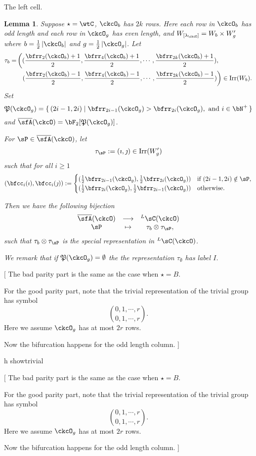 \documentclass[12pt,a4paper]{amsart}
\newcommand{\trivial}[2][]{\if\relax\detokenize{#1}\relax
  {%
      \color{orange} \vspace{0em} $[$  #2 $]$
      \color{black}
  }
  \else
\ifx#1h
\ifcsname showtrivial\endcsname
{%
    \color{orange} \vspace{0em}  $[$ #2 $]$
    \color{black}
}
\fi
\else {\red Wrong argument!} \fi
\fi
}
\def\abs#1{\left|{#1}\right|}
\newcommand{\CQ}{{\mathcal {Q}}}
\numberwithin{equation}{section}
\newtheorem{lem}[thm]{Lemma}
\theoremstyle{remark}
\def\half{{\tfrac{1}{2}}}
\def\Irr{\mathrm{Irr}}
\def\WLamck{W_{[\lambda_{\ckcO}]}}
\def\LC{{}^L\sC}
\def\CQ{\overline{\sfA}}%
\def\CPP{\mathfrak{P}}
\begin{document}
The left cell.
\begin{lem}
  Suppose $\star = \wtC$, $\ckcO_{b}$ has $2k$ rows. Here each row in $\ckcO_{b}$ has
  odd length and each row in $\ckcO_{g}$ has even length, and
  $\WLamck = W_{b}\times W'_{g}$ where $b=\half \abs{\ckcO_{b}}$ and
  $g = \half\abs{\ckcO_{g}}$.
  Let
  \[
    \begin{split}
      \tau_{b} =  & \left( (\frac{\bfrr_{2}(\ckcO_{b})+1}{2}, \frac{\bfrr_{4}(\ckcO_{b})+1}{2}, \cdots, \frac{\bfrr_{2k}(\ckcO_{b})+1}{2}),\right.\\
        &\ \ \left. (\frac{\bfrr_{2}(\ckcO_{b})-1}{2}, \frac{\bfrr_{4}(\ckcO_{b})-1}{2}, \cdots, \frac{\bfrr_{2k}(\ckcO_{b})-1}{2})\right) \in \Irr(W_{b}).
    \end{split}
  \]
  Set
  \[
    \CPP(\ckcO_{g}) = \set{(2i-1,2i)| \bfrr_{2i-1}(\ckcO_{g})> \bfrr_{2i}(\ckcO_{g}), \text{
        and } i\in \bN^{+}}
  \]
  and $\CQ(\ckcO)= \bF_{2}[\CPP(\ckcO_{g})]$.

  For $\sP \in \CQ(\ckcO)$, let
  \[
    \tau_{\sP} := (\imath,\jmath) \in \Irr(W'_{g})
  \]
  such that for all $i\geq 1$
  \[
  (\bfcc_{i}(\imath), \bfcc_{i}(\jmath)):=
  \begin{cases}
    (\half \bfrr_{2i-1}(\ckcO_{g}), \half \bfrr_{2i}(\ckcO_{g}))
    & \text{if } (2i-1,2i)\notin \sP,\\
    (\half \bfrr_{2i}(\ckcO_{g}),\half \bfrr_{2i-1}(\ckcO_{g})) & \text{otherwise.}
  \end{cases}
  \]

  Then we have the following bijection
  \[
    \begin{array}{ccc}
      \CQ(\ckcO) &\longrightarrow & \LC(\ckcO)\\
      \sP & \mapsto & \tau_{b}\otimes \tau_{\sP},
    \end{array}
  \]
  such that $\tau_{b}\otimes \tau_{\sP}$ is the special representation in
  $\LC(\ckcO)$.

  We remark that if $\CPP(\ckcO_{g})=\emptyset$ the the
  representation $\tau_{\emptyset}$ has label $I$.
\end{lem}

\trivial{
  The bad parity part is the same as the case when $\star= B$.


  For the good parity part, note that the trivial representation of
  the trivial group has symbol
  \[
    \binom{0,1,\cdots, r}{0,1,\cdots, r}.
  \]
  Here we assume $\ckcO_{g}$ has at most $2r$ rows.

  Now the bifurcation happens for the odd length column.
  }
\end{document}
